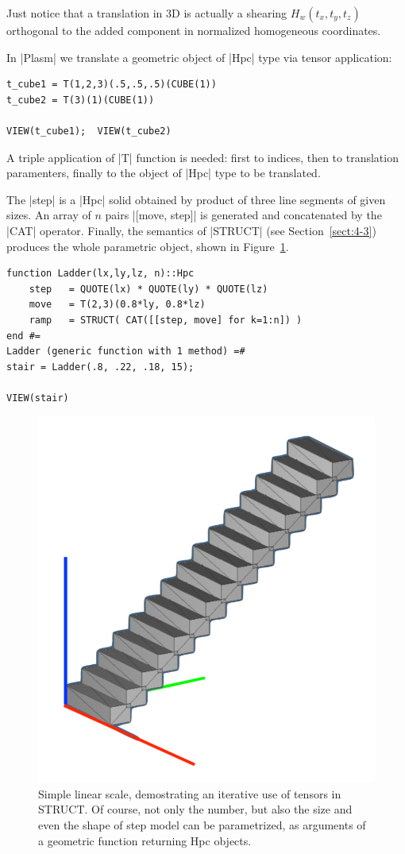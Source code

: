 \begin{coding}
Just notice that a translation in 3D is actually a shearing $H_w(t_x,t_y,t_z)$ orthogonal to the added component in normalized homogeneous coordinates.

\begin{coding} 
In |Plasm| we translate a geometric object of |Hpc| type via tensor application:

\begin{lstlisting}[language=JuliaLocal, style=julia, mathescape=false]
t_cube1 = T(1,2,3)(.5,.5,.5)(CUBE(1))
t_cube2 = T(3)(1)(CUBE(1))

VIEW(t_cube1);  VIEW(t_cube2)
\end{lstlisting}
A triple application of |T| function is needed: first to indices, then to translation paramenters, finally to the object of |Hpc| type to be translated.
\end{coding}

\begin{coding} 
The |step| is a |Hpc| solid obtained by product of three line segments of given sizes.
An array of $n$ pairs |[move, step]| is generated and concatenated by the |CAT| operator.  Finally, the semantics of |STRUCT| (see Section~\ref{sect:4-3}) produces the whole parametric object, shown in Figure~\ref{fig:stair}. 

\begin{lstlisting}[language=JuliaLocal, style=julia, mathescape=false]
function Ladder(lx,ly,lz, n)::Hpc
	step   = QUOTE(lx) * QUOTE(ly) * QUOTE(lz)
	move   = T(2,3)(0.8*ly, 0.8*lz)
	ramp   = STRUCT( CAT([[step, move] for k=1:n]) )
end #=
Ladder (generic function with 1 method)	=#
stair = Ladder(.8, .22, .18, 15);

VIEW(stair)
\end{lstlisting}

\end{coding}



\begin{figure}[htbp] %
   \includegraphics[width=0.35\linewidth]{chapter-04/figs/stair}
   \hspace{5mm}
   \sidecaption[t]
   \caption{Simple linear scale, demostrating an iterative use of tensors in {\small\sf STRUCT}. Of course, not only the number, but also the size and even the shape of {\sf step} model can be parametrized, as arguments of a geometric function returning {\sf Hpc} objects.}
   \label{fig:stair}
\end{figure}  







\end{coding}
